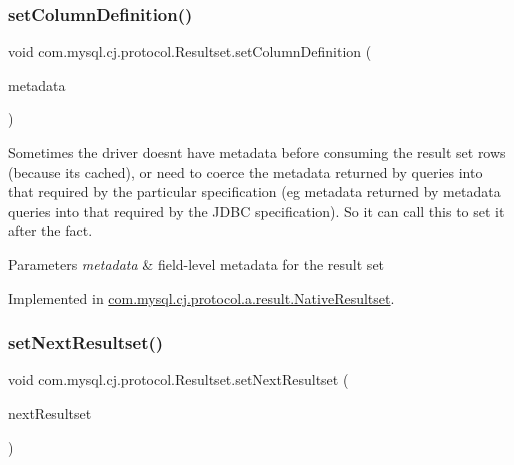\subsubsection{\texorpdfstring{set\+Column\+Definition()}{setColumnDefinition()}}
{\footnotesize\ttfamily void com.\+mysql.\+cj.\+protocol.\+Resultset.\+set\+Column\+Definition (\begin{DoxyParamCaption}\item[{\mbox{\hyperlink{interfacecom_1_1mysql_1_1cj_1_1protocol_1_1_column_definition}{Column\+Definition}}}]{metadata }\end{DoxyParamCaption})}

Sometimes the driver doesn\textquotesingle{}t have metadata before consuming the result set rows (because it\textquotesingle{}s cached), or need to coerce the metadata returned by queries into that required by the particular specification (eg metadata returned by metadata queries into that required by the J\+D\+BC specification). So it can call this to set it after the fact.


\begin{DoxyParams}{Parameters}
{\em metadata} & field-\/level metadata for the result set \\
\hline
\end{DoxyParams}


Implemented in \mbox{\hyperlink{classcom_1_1mysql_1_1cj_1_1protocol_1_1a_1_1result_1_1_native_resultset_a103a093ccb3cf34125ff020ddc9ad6d8}{com.\+mysql.\+cj.\+protocol.\+a.\+result.\+Native\+Resultset}}.

\mbox{\label{interfacecom_1_1mysql_1_1cj_1_1protocol_1_1_resultset_a030e08e421f62239d808fc1be2808ac4}} 
\subsubsection{\texorpdfstring{set\+Next\+Resultset()}{setNextResultset()}}
{\footnotesize\ttfamily void com.\+mysql.\+cj.\+protocol.\+Resultset.\+set\+Next\+Resultset (\begin{DoxyParamCaption}\item[{\mbox{\hyperlink{interfacecom_1_1mysql_1_1cj_1_1protocol_1_1_resultset}{Resultset}}}]{next\+Resultset }\end{DoxyParamCaption})}


